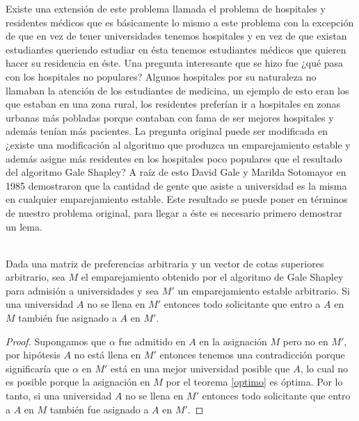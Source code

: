 Existe una extensión de este problema llamada el problema de hospitales y residentes médicos que es básicamente lo mismo a este problema con la excepción de que en vez de tener universidades tenemos hospitales y en vez de que existan estudiantes queriendo estudiar en ésta tenemos estudiantes médicos que quieren hacer su residencia en éste. Una pregunta interesante que se hizo fue ¿qué pasa con los hospitales no populares? Algunos hospitales por su naturaleza no llamaban la atención de los estudiantes de medicina, un ejemplo de esto eran los que estaban en una zona rural, los residentes preferían ir a hospitales en zonas urbanas más pobladas porque contaban con fama de ser mejores hospitales y además tenían más pacientes. La pregunta original puede ser modificada en ¿existe una modificación al algoritmo que produzca un emparejamiento estable y además asigne más residentes en los hospitales poco populares que el resultado del algoritmo Gale Shapley? A raíz de esto David Gale y Marilda Sotomayor en 1985 demostraron que la cantidad de gente que asiste a universidad es la misma en cualquier emparejamiento estable. Este resultado se puede poner en términos de nuestro problema original, para llegar a éste es necesario primero demostrar un lema.

\begin{lem} 
\label{lema rural} 
\cite{Verde} \\
Dada una matriz de preferencias arbitraria y un vector de cotas superiores arbitrario, sea $M$ el emparejamiento obtenido por el algoritmo de Gale Shapley para admisión a universidades y sea $M'$ un emparejamiento estable arbitrario. Si una universidad $A$ no se llena en $M'$ entonces todo solicitante que entro a $A$ en $M$ también fue asignado a $A$ en $M'$. 
\end{lem}
\begin{proof}
Supongamos que $\alpha$ fue admitido en $A$ en la asignación $M$ pero no en $M'$, por hipótesis $A$ no está llena en $M'$ entonces tenemos una contradicción porque significaría que $\alpha$ en $M'$ está en una mejor universidad posible que $A$, lo cual no es posible porque la asignación en $M$ por el teorema \ref{optimo} es óptima. Por lo tanto, si una universidad $A$ no se llena en $M'$ entonces todo solicitante que entro a $A$ en $M$ también fue asignado a $A$ en $M'$. 
\end{proof}


